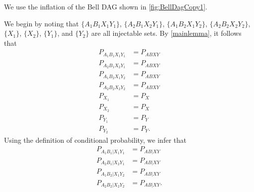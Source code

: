 We use the inflation of the Bell DAG shown in \cref{fig:BellDagCopy1}.

We begin by noting that $\{A_1 B_1 X_1 Y_1\}$, $\{A_2 B_1 X_2 Y_1\}$, $\{A_1 B_2 X_1 Y_2\}$, $\{A_2 B_2 X_2 Y_2\}$, $\{X_1\}$, $\{X_2\}$, $\{Y_1\}$, and $\{Y_2\}$ are all injectable sets. 
By \cref{mainlemma}, it follows that 
\begin{align}
P_{A_1 B_1 X_1 Y_1}&=P_{A B X Y}\label{PR1}\\
P_{A_2 B_1 X_2 Y_1}&=P_{A B X Y}\label{PR2}\\
P_{A_1 B_2 X_1 Y_2}&=P_{A B X Y}\label{PR3}\\
P_{A_2 B_2 X_2 Y_2}&=P_{A B X Y}\label{PR4}\\
P_{X_1}&=P_X\label{PR5}\\
P_{X_2}&=P_X\label{PR6}\\
P_{Y_1}&=P_Y\label{PR7}\\
P_{Y_2}&=P_Y\label{PR8}.
\end{align}
Using the definition of conditional probability, we infer that
\begin{align}
P_{A_1 B_1 |X_1 Y_1}&=P_{A B |X Y}\label{PR1b}\\
P_{A_2 B_1 |X_2 Y_1}&=P_{A B |X Y}\label{PR2b}\\
P_{A_1 B_2 |X_1 Y_2}&=P_{A B |X Y}\label{PR3b}\\
P_{A_2 B_2 |X_2 Y_2}&=P_{A B |X Y}\label{PR4b}.
\end{align}

